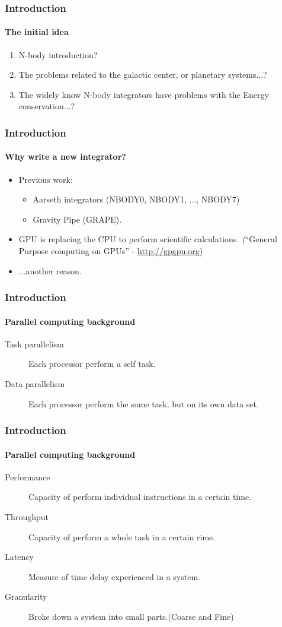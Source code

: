 \begin{frame}
    \frametitle{Introduction}
    \framesubtitle{The initial idea}
    \begin{enumerate}
        \item N-body introduction?
        \item The problems related to the galactic center,
              or planetary systems...?
        \item The widely know N-body integrators have problems
              with the Energy conservation...?
    \end{enumerate}
\end{frame}

\begin{frame}
    \frametitle{Introduction}
    \framesubtitle{Why write a new integrator?}
    \begin{itemize}
            \item Previous work:
            \begin{itemize}
                \item Aarseth integrators (NBODY0, NBODY1, ..., NBODY7)
                \item Gravity Pipe (GRAPE).
            \end{itemize}
            \item GPU is replacing the CPU to perform scientific calculations.
                 \emph(``General Purpose computing on GPUs'' - \url{http://gpgpu.org})
            \item ...another reason.
    \end{itemize}
\end{frame}

\begin{frame}
    \frametitle{Introduction}
    \framesubtitle{Parallel computing background}
    \begin{description}
        \item[Task parallelism]
            Each processor perform a self task.
        \item[Data parallelism]
            Each processor perform the same task, but on its own data set.
    \end{description}
\end{frame}

\begin{frame}
    \frametitle{Introduction}
    \framesubtitle{Parallel computing background}
    \begin{description}
        \item[Performance]
                Capacity of perform individual instructions in a certain time.
        \item[Throughput]
                Capacity of perform a whole task in a certain rime.
        \item[Latency]
                Measure of time delay experienced in a system.
        \item[Granularity]
                Broke down a system into small parts.(Coarse and Fine)
    \end{description}
\end{frame}

